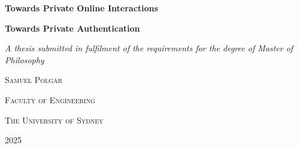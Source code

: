 \begin{titlepage}
    \centering
    {\Huge \textbf{Towards Private Online Interactions} \par} \vspace{1.5cm}
    {\Huge \textbf{Towards Private Authentication} \par} \vspace{1.5cm}
    {\large \emph{A thesis submitted in fulfilment of the requirements for the degree of Master of Philosophy}\par} \vspace{2cm}
    {\LARGE \textsc{Samuel Polgar} \par} \vspace{9cm}
    {\Large \textsc{Faculty of Engineering}\par}
    {\Large \textsc{The University of Sydney} \par} \vspace{1cm}
    {\large 2025}
\end{titlepage}